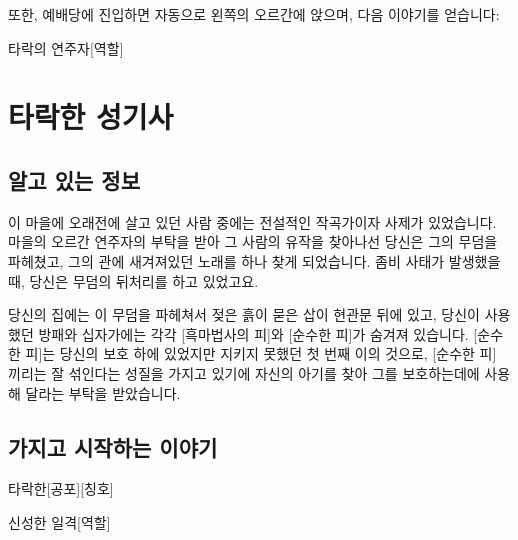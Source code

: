 \documentclass{report}
\begin{document}
			또한, 예배당에 진입하면 자동으로 왼쪽의 오르간에 앉으며, 다음 이야기를 얻습니다:
			\begin{spoiler}{타락의 연주자}{[역할]}
				
				
			\end{spoiler}
	
	
	
	
	
	\pagebreak \hypertarget{corrupt-paladin}{}
	\section{타락한 성기사}
		\subsection*{알고 있는 정보}
			이 마을에 오래전에 살고 있던 사람 중에는 전설적인 작곡가이자 사제가 있었습니다. 마을의 오르간 연주자의 부탁을 받아 그 사람의 유작을 찾아나선 당신은 그의 무덤을 파헤쳤고, 그의 관에 새겨져있던 노래를 하나 찾게 되었습니다. 좀비 사태가 발생했을 때, 당신은 무덤의 뒤처리를 하고 있었고요.
			
			당신의 집에는 이 무덤을 파헤쳐서 젖은 흙이 묻은 삽이 현관문 뒤에 있고, 당신이 사용했던 방패와 십자가에는 각각 [흑마법사의 피]와 [순수한 피]가 숨겨져 있습니다. [순수한 피]는 당신의 보호 하에 있었지만 지키지 못했던 첫 번째 이의 것으로, [순수한 피] 끼리는 잘 섞인다는 성질을 가지고 있기에 자신의 아기를 찾아 그를 보호하는데에 사용해 달라는 부탁을 받았습니다.
			
		\subsection*{가지고 시작하는 이야기}
			\begin{spoiler}{타락한}{[공포][칭호]}
				
			\end{spoiler}
			
			\begin{spoiler}{신성한 일격}{[역할]}
			\end{spoiler}
		
\end{document}
